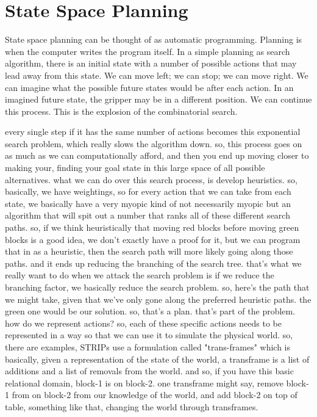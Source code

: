 \section{State Space Planning}

State space planning can be thought of as automatic programming.
Planning is when the computer writes the program itself.  In a simple
planning as search algorithm, there is an initial state with a number
of possible actions that may lead away from this state.  We can move
left; we can stop; we can move right.  We can imagine what the
possible future states would be after each action.  In an imagined
future state, the gripper may be in a different position.  We can
continue this process.  This is the explosion of the combinatorial
search.

every single step if it has the same number of actions becomes this exponential search problem, which really slows the algorithm down.
so, this process goes on as much as we can computationally afford, and then you end up moving closer to making your, finding your goal state in this large space of all possible alternatives.
what we can do over this search process, is develop heuristics.
so, basically, we have weightings, so for every action that we can take from each state, we basically have a very myopic kind of not necessarily myopic but an algorithm that will spit out a number that ranks all of these different search paths.
so, if we think heuristically that moving red blocks before moving green blocks is a good idea, we don't exactly have a proof for it, but we can program that in as a heuristic, then the search path will more likely going along those paths.
and it ends up reducing the branching of the search tree.
that's what we really want to do when we attack the search problem is if we reduce the branching factor, we basically reduce the search problem.
so, here's the path that we might take, given that we've only gone along the preferred heuristic paths.
the green one would be our solution.
so, that's a plan.
that's part of the problem.
how do we represent actions?
so, each of these specific actions needs to be represented in a way so that we can use it to simulate the physical world.
so, there are examples, STRIPs use a formulation called "trans-frames" which is basically, given a representation of the state of the world, a transframe is a list of additions and a list of removals from the world.
and so, if you have this basic relational domain, block-1 is on block-2.
one transframe might say, remove block-1 from on block-2 from our knowledge of the world, and add block-2 on top of table, something like that, changing the world through transframes.
